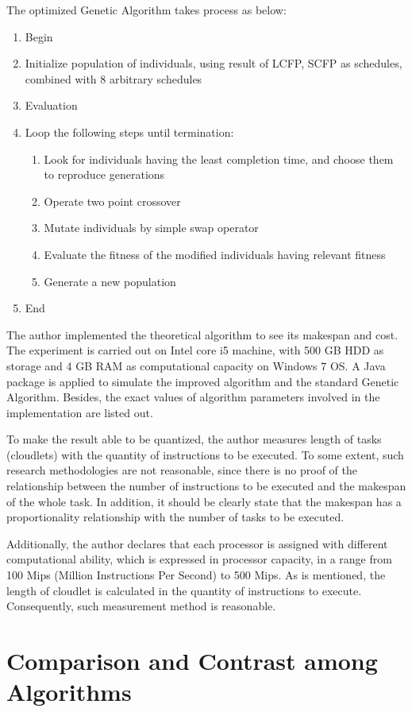 \documentclass[10pt,twoside,openright,logo]{report}
\begin{document}
The optimized Genetic Algorithm takes process as below:
\begin{enumerate}
	\item Begin
	\item Initialize population of individuals, using result of LCFP, SCFP as schedules, combined with 8 arbitrary schedules
	\item Evaluation
	\item Loop the following steps until termination:
	\begin{enumerate}
		\item Look for individuals having the least completion time, and choose them to reproduce generations
		\item Operate two point crossover
		\item Mutate individuals by simple swap operator
		\item Evaluate the fitness of the modified individuals having relevant fitness
		\item Generate a new population
	\end{enumerate}
	\item End
\end{enumerate}
The author implemented the theoretical algorithm to see its makespan and cost. The experiment is carried out on Intel core i5 machine, with 500 GB HDD as storage and 4 GB RAM as computational capacity on Windows 7 OS. A Java package is applied to simulate the improved algorithm and the standard Genetic Algorithm. Besides, the exact values of algorithm parameters involved in the implementation are listed out.

To make the result able to be quantized, the author measures length of tasks (cloudlets) with the quantity of instructions to be executed. To some extent, such research methodologies are not reasonable, since there is no proof of the relationship between the number of instructions to be executed and the makespan of the whole task. In addition, it should be clearly state that the makespan has a proportionality relationship with the number of tasks to be executed.

Additionally, the author declares that each processor is assigned with different computational ability, which is expressed in processor capacity, in a range from 100 Mips (Million Instructions Per Second) to 500 Mips. As is mentioned, the length of cloudlet is calculated in the quantity of instructions to execute. Consequently, such measurement method is reasonable.

\chapter{Comparison and Contrast among Algorithms}
\end{document}
